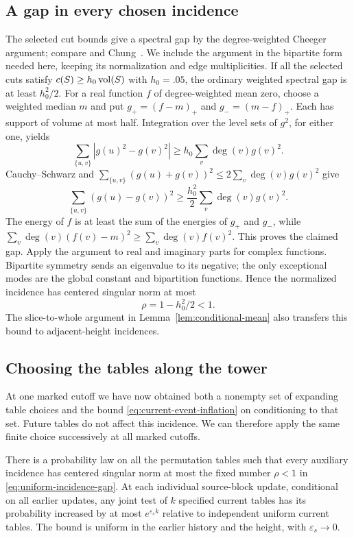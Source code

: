 \subsection{A gap in every chosen incidence}

The selected cut bounds give a spectral gap by the degree-weighted
Cheeger argument; compare \cite[Lemma~3.3]{SJ89} and
Chung~\cite[Section~3, Theorem~1]{ChungCheeger}.  We include the
argument in the bipartite form needed here, keeping its normalization
and edge multiplicities.
If all the selected cuts satisfy $c(S)\geq h_0\operatorname{vol}(S)$ with
$h_0=.05$, the ordinary weighted spectral gap is at least
$h_0^2/2$.
For a real function $f$ of degree-weighted mean zero, choose a
weighted median $m$ and put $g_+=(f-m)_+$ and $g_-=(m-f)_+$.
Each has support of volume at most half.  Integration over the
level sets of $g^2$, for either one, yields
\[
 \sum_{\{u,v\}}|g(u)^2-g(v)^2|
       \geq h_0\sum_v\deg(v)g(v)^2.
\]
Cauchy--Schwarz and
$\sum_{\{u,v\}}(g(u)+g(v))^2\leq2\sum_v\deg(v)g(v)^2$
give
\[
 \sum_{\{u,v\}}(g(u)-g(v))^2
       \geq\frac{h_0^2}{2}\sum_v\deg(v)g(v)^2.
\]
The energy of $f$ is at least the sum of the energies of $g_+$
and $g_-$, while
$\sum_v\deg(v)(f(v)-m)^2\geq\sum_v\deg(v)f(v)^2$.
This proves the claimed gap.  Apply the argument to real and
imaginary parts for complex functions.  Bipartite symmetry sends
an eigenvalue to its negative; the only exceptional modes are
the global constant and bipartition functions.  Hence the
normalized incidence has centered singular norm at most
\begin{equation}\label{eq:uniform-incidence-gap}
 \rho=1-h_0^2/2<1.
\end{equation}
The slice-to-whole argument in Lemma~\ref{lem:conditional-mean}
also transfers this bound to adjacent-height incidences.

\subsection{Choosing the tables along the tower}

At one marked cutoff we have now obtained both a nonempty set of
expanding table choices and the bound
\eqref{eq:current-event-inflation} on conditioning to that set.  Future
tables do not affect this incidence.  We can therefore apply the same
finite choice successively at all marked cutoffs.

\begin{proposition}\label{prop:sequential-law}
There is a probability law on all the permutation tables such that
every auxiliary incidence has centered singular norm at most the
fixed number $\rho<1$ in \eqref{eq:uniform-incidence-gap}.
At each individual source-block update, conditional on all earlier
updates, any joint test of $k$ specified current tables has its
probability increased by at most $e^{\varepsilon_s k}$ relative
to independent uniform current tables.  The bound is uniform in
the earlier history and the height, with $\varepsilon_s\to0$.
\end{proposition}

